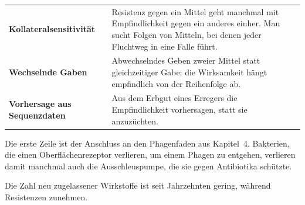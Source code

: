\begin{forschung}
\begin{center}
{\small
\renewcommand{\arraystretch}{1.45}
\begin{tabular}{@{}P{2.8cm}P{5.4cm}@{}}
\toprule
\textbf{Kollateral\-sensitivität} & Resistenz gegen ein Mittel geht manchmal mit  Empfindlichkeit gegen ein anderes einher. Man sucht Folgen von Mitteln, bei denen jeder Fluchtweg in eine Falle führt.\\
\textbf{Wechselnde Gaben} & Abwechselndes Geben zweier Mittel statt gleichzeitiger Gabe; die Wirksamkeit hängt empfindlich von der Reihenfolge ab.\\
\textbf{Vorhersage aus Sequenzdaten} & Aus dem Erbgut eines Erregers die Empfindlichkeit vorhersagen, statt sie anzuzüchten.\\
\bottomrule
\end{tabular}}
\end{center}

Die erste Zeile ist der Anschluss an den Phagenfaden aus Kapitel~4. Bakterien, die einen Oberflächenrezeptor verlieren, um einem Phagen zu entgehen, verlieren damit manchmal auch die Ausschleuspumpe, die sie gegen Antibiotika schützte.

\begin{center}
\begin{minipage}{0.88\textwidth}
\end{minipage}
\end{center}

Die Zahl neu zugelassener Wirkstoffe ist seit Jahrzehnten gering, während Resistenzen zunehmen.

\begin{center}
\begin{minipage}{0.88\textwidth}
\end{minipage}
\end{center}
\end{forschung}

